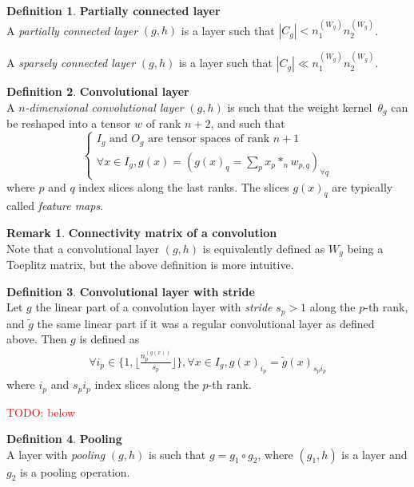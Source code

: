 \documentclass{article}
\theoremstyle{definition}
\newtheorem{definition}{Definition}[section]
\newtheorem{remark}{Remark}
\newcommand{\todo}[1]{\textcolor{red}{TODO: #1\\}}
\begin{document}
\begin{definition}\textbf{Partially connected layer}\\
A \textit{partially connected layer} $(g,h)$ is a layer such that $|C_g| < n_1^{(W_g)} n_2^{(W_g)}$.

A \textit{sparsely connected layer} $(g,h)$ is a layer such that $|C_g| \ll n_1^{(W_g)} n_2^{(W_g)}$.
\end{definition}

\begin{definition}\textbf{Convolutional layer}\\
A \textit{$n$-dimensional convolutional layer} $(g,h)$ is such that the weight kernel~$\theta_g$ can be reshaped into a tensor $w$ of rank $n+2$, and such that
$$
\left\{
\begin{array}{l}
  I_g \mbox{ and } O_g \mbox{ are tensor spaces of rank }n+1 \\
  \forall x \in I_g, g(x) = (g(x)_q = \sum\limits_p{x_p \ast_n w_{p,q}})_{\forall q}
\end{array}
\right.
$$
where $p$ and $q$ index slices along the last ranks. The slices $g(x)_q$ are typically called \textit{feature maps}.
\end{definition}

\begin{remark}\textbf{Connectivity matrix of a convolution}\\
Note that a convolutional layer $(g,h)$ is equivalently defined as $W_g$ being a Toeplitz matrix, but the above definition is more intuitive.
\end{remark}

\begin{definition}\textbf{Convolutional layer with stride}\\
Let $g$ the linear part of a convolution layer with \emph{stride} $s_p > 1$ along the $p$-th rank, and $\widetilde{g}$ the same linear part if it was a regular convolutional layer as defined above. Then $g$ is defined as
\begin{gather*}
  \forall i_p \in \{ 1, \lfloor \frac{n_p^{(g(x))}}{s_p} \rfloor \}, \forall x \in I_g, g(x)_{i_p} = \widetilde{g}(x)_{s_p i_p}
\end{gather*}
where $i_p$ and $s_p i_p$ index slices along the $p$-th rank.
\end{definition}

\todo{below}

\begin{definition}\textbf{Pooling}\\
A layer with \textit{pooling} $(g,h)$ is such that $g = g_1 \circ g_2$, where $(g_1,h)$ is a layer and $g_2$ is a pooling operation.

\end{definition}
\end{document}

